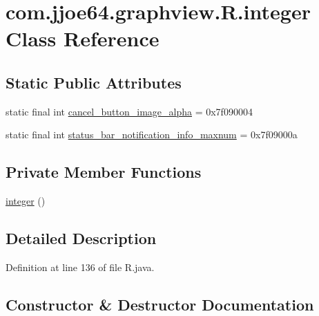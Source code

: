 \hypertarget{classcom_1_1jjoe64_1_1graphview_1_1_r_1_1integer}{}\section{com.\+jjoe64.\+graphview.\+R.\+integer Class Reference}
\label{classcom_1_1jjoe64_1_1graphview_1_1_r_1_1integer}
\subsection*{Static Public Attributes}
\begin{DoxyCompactItemize}
\item 
static final int \mbox{\hyperlink{classcom_1_1jjoe64_1_1graphview_1_1_r_1_1integer_acd6a5cb41a63f29e42864de212614aec}{cancel\+\_\+button\+\_\+image\+\_\+alpha}} = 0x7f090004
\item 
static final int \mbox{\hyperlink{classcom_1_1jjoe64_1_1graphview_1_1_r_1_1integer_a863beefc81697d8162540dc4b3beba61}{status\+\_\+bar\+\_\+notification\+\_\+info\+\_\+maxnum}} = 0x7f09000a
\end{DoxyCompactItemize}
\subsection*{Private Member Functions}
\begin{DoxyCompactItemize}
\item 
\mbox{\hyperlink{classcom_1_1jjoe64_1_1graphview_1_1_r_1_1integer_aef24b49c312af99fba25e5d4484af41a}{integer}} ()
\end{DoxyCompactItemize}


\subsection{Detailed Description}


Definition at line 136 of file R.\+java.



\subsection{Constructor \& Destructor Documentation}
\mbox{\label{classcom_1_1jjoe64_1_1graphview_1_1_r_1_1integer_aef24b49c312af99fba25e5d4484af41a}} 
